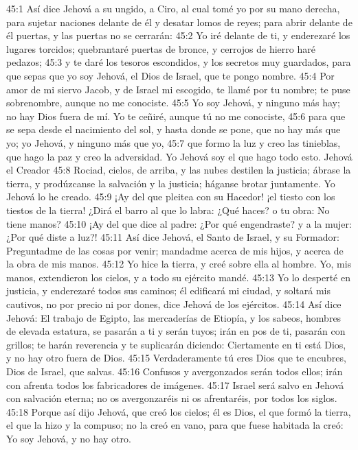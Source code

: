 45:1 Así dice Jehová a su ungido, a Ciro, al cual tomé yo por su mano derecha, para sujetar naciones delante de él y desatar lomos de reyes; para abrir delante de él puertas, y las puertas no se cerrarán: 
45:2 Yo iré delante de ti, y enderezaré los lugares torcidos; quebrantaré puertas de bronce, y cerrojos de hierro haré pedazos; 
45:3 y te daré los tesoros escondidos, y los secretos muy guardados, para que sepas que yo soy Jehová, el Dios de Israel, que te pongo nombre. 
45:4 Por amor de mi siervo Jacob, y de Israel mi escogido, te llamé por tu nombre; te puse sobrenombre, aunque no me conociste. 
45:5 Yo soy Jehová, y ninguno más hay; no hay Dios fuera de mí. Yo te ceñiré, aunque tú no me conociste, 
45:6 para que se sepa desde el nacimiento del sol, y hasta donde se pone, que no hay más que yo; yo Jehová, y ninguno más que yo, 
45:7 que formo la luz y creo las tinieblas, que hago la paz y creo la adversidad. Yo Jehová soy el que hago todo esto. 
Jehová el Creador 
45:8 Rociad, cielos, de arriba, y las nubes destilen la justicia; ábrase la tierra, y prodúzcanse la salvación y la justicia; háganse brotar juntamente. Yo Jehová lo he creado. 
45:9 ¡Ay del que pleitea con su Hacedor! ¡el tiesto con los tiestos de la tierra! ¿Dirá el barro al que lo labra: ¿Qué haces? o tu obra: No tiene manos? 
45:10 ¡Ay del que dice al padre: ¿Por qué engendraste? y a la mujer: ¿Por qué diste a luz?! 
45:11 Así dice Jehová, el Santo de Israel, y su Formador: Preguntadme de las cosas por venir; mandadme acerca de mis hijos, y acerca de la obra de mis manos. 
45:12 Yo hice la tierra, y creé sobre ella al hombre. Yo, mis manos, extendieron los cielos, y a todo su ejército mandé. 
45:13 Yo lo desperté en justicia, y enderezaré todos sus caminos; él edificará mi ciudad, y soltará mis cautivos, no por precio ni por dones, dice Jehová de los ejércitos. 
45:14 Así dice Jehová: El trabajo de Egipto, las mercaderías de Etiopía, y los sabeos, hombres de elevada estatura, se pasarán a ti y serán tuyos; irán en pos de ti, pasarán con grillos; te harán reverencia y te suplicarán diciendo: Ciertamente en ti está Dios, y no hay otro fuera de Dios. 
45:15 Verdaderamente tú eres Dios que te encubres, Dios de Israel, que salvas. 
45:16 Confusos y avergonzados serán todos ellos; irán con afrenta todos los fabricadores de imágenes. 
45:17 Israel será salvo en Jehová con salvación eterna; no os avergonzaréis ni os afrentaréis, por todos los siglos. 
45:18 Porque así dijo Jehová, que creó los cielos; él es Dios, el que formó la tierra, el que la hizo y la compuso; no la creó en vano, para que fuese habitada la creó: Yo soy Jehová, y no hay otro. 
